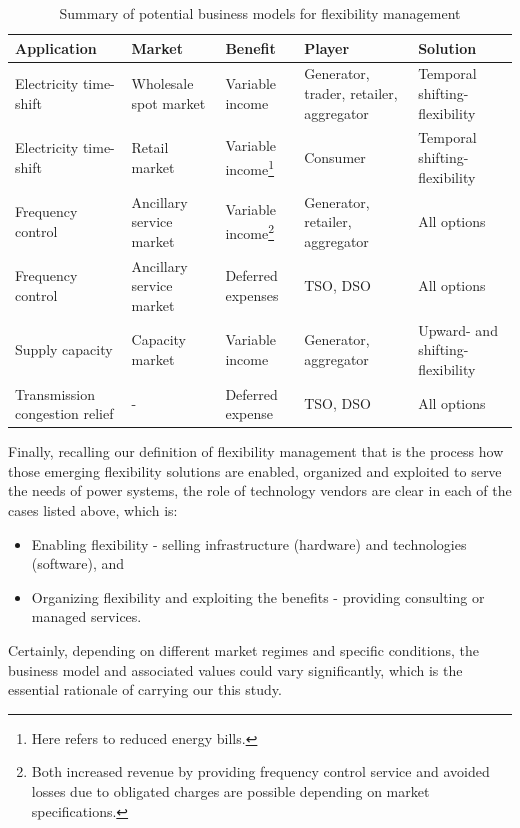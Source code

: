 \begin{table}[h!]
	\centering
	\begin{tabular}{L{2.5cm} L{2.5cm} L{2.5cm} L{2.5cm} L{3cm} }
		\hline
		\hline
		Application & Market & Benefit & Player & Solution \\
		\hline
		\hline
		Electricity time-shift & Wholesale spot market & Variable income & Generator, trader, retailer, aggregator & Temporal shifting-flexibility \\
		\hline
		Electricity time-shift & Retail market & Variable income\footnote{Here refers to reduced energy bills.} & Consumer & Temporal shifting-flexibility \\
		\hline
		Frequency control & Ancillary service market & Variable income\footnote{Both increased revenue by providing frequency control service and avoided losses due to obligated charges are possible depending on market specifications.} & Generator, retailer, aggregator & All options \\
		\hline
		Frequency control & Ancillary service market & Deferred expenses & TSO, DSO & All options \\
		\hline
		Supply capacity & Capacity market & Variable income & Generator, aggregator & Upward- and shifting- flexibility\\
		\hline
		Transmission congestion relief & - & Deferred expense & TSO, DSO & All options \\
		\hline
		\hline
	\end{tabular}
\caption{Summary of potential business models for flexibility management}\label{tab:summary-biz-model}
\end{table}

Finally, recalling our definition of flexibility management that is the process how those emerging flexibility solutions are enabled, organized and exploited to serve the needs of power systems, the role of technology vendors are clear in each of the cases listed above, which is:

\begin{itemize}
	\item Enabling flexibility - selling infrastructure (hardware) and technologies (software), and 
	\item Organizing flexibility and exploiting the benefits - providing consulting or managed services.
\end{itemize}

Certainly, depending on different market regimes and specific conditions, the business model and associated values could vary significantly, which is the essential rationale of carrying our this study.

